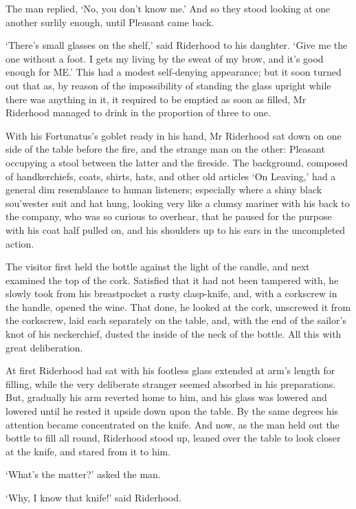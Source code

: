 The man replied, ‘No, you don’t know me.’ And so they stood looking at
one another surlily enough, until Pleasant came back.

‘There’s small glasses on the shelf,’ said Riderhood to his daughter.
‘Give me the one without a foot. I gets my living by the sweat of my
brow, and it’s good enough for ME.’ This had a modest self-denying
appearance; but it soon turned out that as, by reason of the
impossibility of standing the glass upright while there was anything in
it, it required to be emptied as soon as filled, Mr Riderhood managed to
drink in the proportion of three to one.

With his Fortunatus’s goblet ready in his hand, Mr Riderhood sat down on
one side of the table before the fire, and the strange man on the other:
Pleasant occupying a stool between the latter and the fireside. The
background, composed of handkerchiefs, coats, shirts, hats, and other
old articles ‘On Leaving,’ had a general dim resemblance to human
listeners; especially where a shiny black sou’wester suit and hat hung,
looking very like a clumsy mariner with his back to the company, who
was so curious to overhear, that he paused for the purpose with his
coat half pulled on, and his shoulders up to his ears in the uncompleted
action.

The visitor first held the bottle against the light of the candle,
and next examined the top of the cork. Satisfied that it had not been
tampered with, he slowly took from his breastpocket a rusty clasp-knife,
and, with a corkscrew in the handle, opened the wine. That done,
he looked at the cork, unscrewed it from the corkscrew, laid each
separately on the table, and, with the end of the sailor’s knot of his
neckerchief, dusted the inside of the neck of the bottle. All this with
great deliberation.

At first Riderhood had sat with his footless glass extended at arm’s
length for filling, while the very deliberate stranger seemed absorbed
in his preparations. But, gradually his arm reverted home to him, and
his glass was lowered and lowered until he rested it upside down upon
the table. By the same degrees his attention became concentrated on
the knife. And now, as the man held out the bottle to fill all round,
Riderhood stood up, leaned over the table to look closer at the knife,
and stared from it to him.

‘What’s the matter?’ asked the man.

‘Why, I know that knife!’ said Riderhood.

